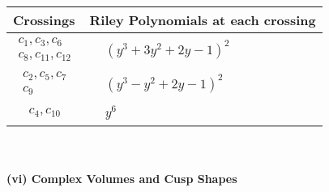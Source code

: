\documentclass[1p]{elsarticle_modified}
\theoremstyle{definition}
\begin{document}
\begin{tabular}{m{50pt}|m{274pt}}
Crossings & \hspace{64pt}Riley Polynomials at each crossing \\
\hline $$\begin{aligned}c_{1},c_{3},c_{6}\\c_{8},c_{11},c_{12}\end{aligned}$$&$\begin{aligned}
&(y^3+3 y^2+2 y-1)^2
\end{aligned}$\\
\hline $$\begin{aligned}c_{2},c_{5},c_{7}\\c_{9}\end{aligned}$$&$\begin{aligned}
&(y^3- y^2+2 y-1)^2
\end{aligned}$\\
\hline $$\begin{aligned}c_{4},c_{10}\end{aligned}$$&$\begin{aligned}
&y^6
\end{aligned}$\\
\hline
\end{tabular}\\~\\
\newpage\flushleft \textbf{(vi) Complex Volumes and Cusp Shapes}
\end{document}
